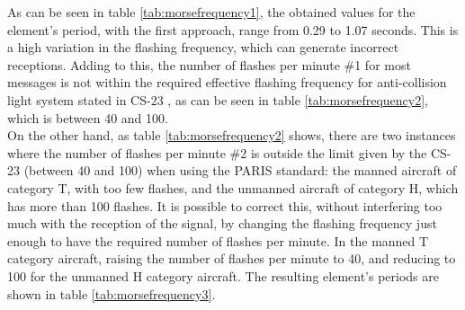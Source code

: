As can be seen in table \ref{tab:morsefrequency1}, the obtained values for the element's period, with the first approach, range from 0.29 to 1.07 seconds. This is a high variation in the flashing frequency, which can generate incorrect receptions. Adding to this, the number of flashes per minute \#1 for most messages is not within the required effective flashing frequency for anti-collision light system stated in CS-23 \citep{Easa2012}, as can be seen in table \ref{tab:morsefrequency2}, which is between 40 and 100.\\
On the other hand, as table \ref{tab:morsefrequency2} shows, there are two instances where the number of flashes per minute \#2 is outside the limit given by the CS-23 \citep{Easa2012} (between 40 and 100) when using the PARIS standard: the manned aircraft of category T, with too few flashes, and the unmanned aircraft of category H, which has more than 100 flashes. It is possible to correct this, without interfering too much with the reception of the signal, by changing the flashing frequency just enough to have the required number of flashes per minute. In the manned T category aircraft, raising the number of flashes per minute to 40, and reducing to 100 for the unmanned H category aircraft. The resulting element's periods are shown in table \ref{tab:morsefrequency3}.
